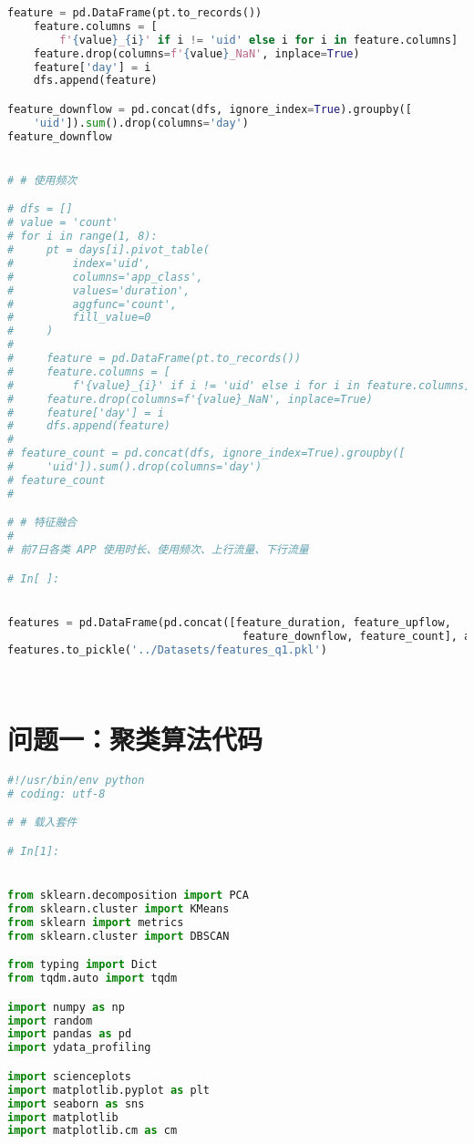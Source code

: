 \documentclass[withoutpreface,bwprint]{cumcmthesis}
\begin{document}
\begin{appendices}
\begin{lstlisting}[language=Python]
    feature = pd.DataFrame(pt.to_records())
    feature.columns = [
        f'{value}_{i}' if i != 'uid' else i for i in feature.columns]
    feature.drop(columns=f'{value}_NaN', inplace=True)
    feature['day'] = i
    dfs.append(feature)

feature_downflow = pd.concat(dfs, ignore_index=True).groupby([
    'uid']).sum().drop(columns='day')
feature_downflow


# # 使用频次

# dfs = []
# value = 'count'
# for i in range(1, 8):
#     pt = days[i].pivot_table(
#         index='uid',
#         columns='app_class',
#         values='duration',
#         aggfunc='count',
#         fill_value=0
#     )
# 
#     feature = pd.DataFrame(pt.to_records())
#     feature.columns = [
#         f'{value}_{i}' if i != 'uid' else i for i in feature.columns]
#     feature.drop(columns=f'{value}_NaN', inplace=True)
#     feature['day'] = i
#     dfs.append(feature)
# 
# feature_count = pd.concat(dfs, ignore_index=True).groupby([
#     'uid']).sum().drop(columns='day')
# feature_count
# 

# # 特征融合
# 
# 前7日各类 APP 使用时长、使用频次、上行流量、下行流量

# In[ ]:


features = pd.DataFrame(pd.concat([feature_duration, feature_upflow,
                                    feature_downflow, feature_count], axis=1).to_records())
features.to_pickle('../Datasets/features_q1.pkl')

        
    \end{lstlisting}

    \section{问题一：聚类算法代码}

    \begin{lstlisting}[language=Python]
#!/usr/bin/env python
# coding: utf-8

# # 载入套件

# In[1]:


from sklearn.decomposition import PCA
from sklearn.cluster import KMeans
from sklearn import metrics
from sklearn.cluster import DBSCAN

from typing import Dict
from tqdm.auto import tqdm

import numpy as np
import random
import pandas as pd
import ydata_profiling

import scienceplots
import matplotlib.pyplot as plt
import seaborn as sns
import matplotlib
import matplotlib.cm as cm


\end{lstlisting}
\end{appendices}
\end{document}
